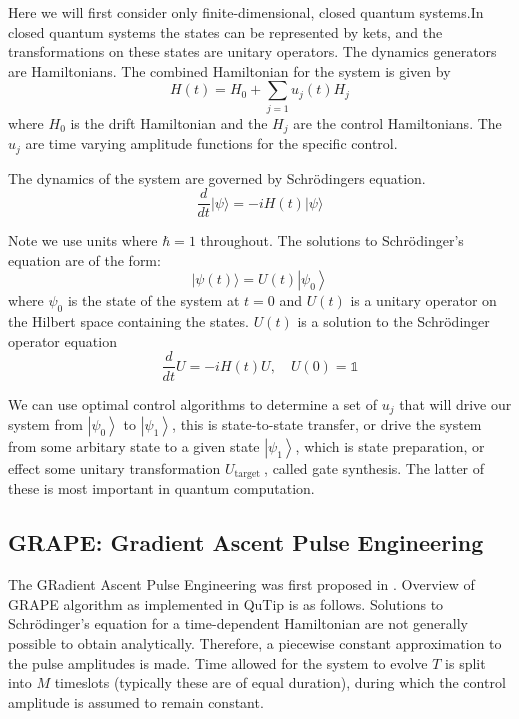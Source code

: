 \documentclass[12pt]{article}
\begin{document}
Here we will first consider only finite-dimensional, closed quantum systems.In closed quantum systems the states can be represented by kets, and the transformations on these states are unitary operators. 
The dynamics generators are Hamiltonians. The combined Hamiltonian for the system is given by
$$
H(t)=H_0+\sum_{j=1} u_j(t) H_j
$$
where $H_0$ is the drift Hamiltonian and the $H_j$ are the control Hamiltonians. The $u_j$ are time varying amplitude functions for the specific control.

The dynamics of the system are governed by Schrödingers equation.
$$
\frac{d}{d t}|\psi\rangle=-i H(t)|\psi\rangle
$$

Note we use units where $\hbar=1$ throughout. The solutions to Schrödinger's equation are of the form:
$$
|\psi(t)\rangle=U(t)\left|\psi_0\right\rangle
$$
where $\psi_0$ is the state of the system at $t=0$ and $U(t)$ is a unitary operator on the Hilbert space containing the states. 
$U(t)$ is a solution to the Schrödinger operator equation
$$
\frac{d}{d t} U=-i H(t) U, \quad U(0)=\mathbb{1}
$$

We can use optimal control algorithms to determine a set of $u_j$ that will drive our system from $\left|\psi_0\right\rangle$ to $\left|\psi_1\right\rangle$, this is state-to-state transfer, or drive the system from some arbitary state to a given state $\left|\psi_1\right\rangle$, which is state preparation, or effect some unitary transformation $U_{\text {target }}$, called gate synthesis. 
The latter of these is most important in quantum computation.

\subsection{GRAPE: Gradient Ascent Pulse Engineering}
The GRadient Ascent Pulse Engineering was first proposed in \cite{KHANEJA2005296}. 
Overview of GRAPE algorithm as implemented in QuTip is as follows. 
Solutions to Schrödinger's equation for a time-dependent Hamiltonian are not generally possible to obtain analytically. 
Therefore, a piecewise constant approximation to the pulse amplitudes is made. Time allowed for the system to evolve $T$ is split into $M$ timeslots (typically these are of equal duration), during which the control amplitude is assumed to remain constant. 
\end{document}
